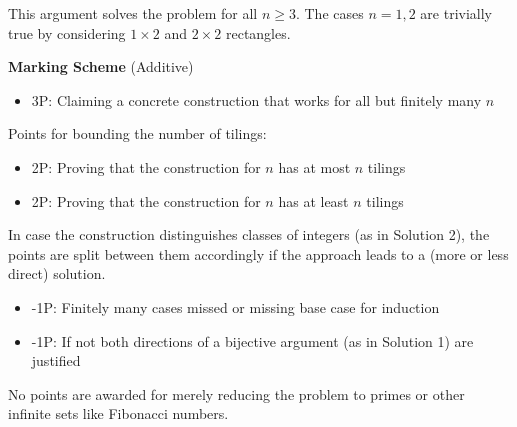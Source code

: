 This argument solves the problem for all $n\geq 3$. The cases $n = 1,2$ are trivially true by considering $1\times 2$ and $2\times 2$ rectangles.

\bigskip

\textbf{Marking Scheme} (Additive)

\begin{itemize}
\item 3P: Claiming a concrete construction that works for all but finitely many $n$
\end{itemize}
Points for bounding the number of tilings:
\begin{itemize}
\item 2P: Proving that the construction for $n$ has at most $n$ tilings
\item 2P: Proving that the construction for $n$ has at least $n$ tilings
\end{itemize}

In case the construction distinguishes classes of integers (as in Solution 2), the points are split between them accordingly if the approach leads to a (more or less direct) solution.

\begin{itemize}
\item -1P: Finitely many cases missed or missing base case for induction
\item -1P: If not both directions of a bijective argument (as in Solution 1) are justified
\end{itemize}

No points are awarded for merely reducing the problem to primes or other infinite sets like Fibonacci numbers.